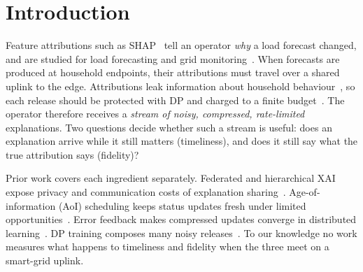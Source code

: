 \documentclass[conference]{IEEEtran}
\begin{document}
\section{Introduction}
Feature attributions such as SHAP~\cite{lundberg2017shap} tell an operator
\emph{why} a load forecast changed, and are studied for load forecasting and
grid monitoring~\cite{baur2024loadxai,gebhard2025anomaly}. When forecasts are
produced at household endpoints, their attributions must travel over a shared
uplink to the edge. Attributions leak information about household
behaviour~\cite{shokri2021privacy}, so each release should be protected with DP
and charged to a finite budget~\cite{dwork2006calibrating,mironov2017rdp}. The
operator therefore receives a \emph{stream of noisy, compressed, rate-limited}
explanations. Two questions decide whether such a stream is useful: does an
explanation arrive while it still matters (timeliness), and does it still say
what the true attribution says (fidelity)?

Prior work covers each ingredient separately. Federated and hierarchical XAI
expose privacy and communication costs of explanation
sharing~\cite{gholizade2026fedxai,sengupta2026hxai}. Age-of-information (AoI)
scheduling keeps status updates fresh under limited
opportunities~\cite{kaul2012aoi,yates2019aoi,aoi2025feedback}. Error feedback
makes compressed updates converge in distributed
learning~\cite{karimireddy2019ef}. DP training composes many noisy
releases~\cite{abadi2016dpsgd}. To our knowledge no work measures what happens
to timeliness and fidelity when the three meet on a smart-grid uplink.
\end{document}
